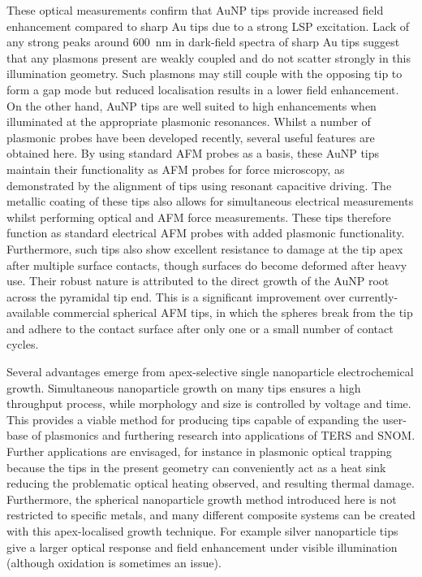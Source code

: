 \documentclass{article}
\begin{document}
These optical measurements confirm that AuNP tips provide increased field enhancement compared to sharp Au tips due to a strong LSP excitation. Lack of any strong peaks around \SI{600}{nm} in dark-field spectra of sharp Au tips suggest that any plasmons present are weakly coupled and do not scatter strongly in this illumination geometry. Such plasmons may still couple with the opposing tip to form a gap mode but reduced localisation results in a lower field enhancement. On the other hand, AuNP tips are well suited to high enhancements when illuminated at the appropriate plasmonic resonances.
Whilst a number of plasmonic probes have been developed recently, several useful features are obtained here. By using standard AFM probes as a basis, these AuNP tips maintain their functionality as AFM probes for force microscopy, as demonstrated by the alignment of tips using resonant capacitive driving. The metallic coating of these tips also allows for simultaneous electrical measurements whilst performing optical and AFM force measurements. These tips therefore function as standard electrical AFM probes with added plasmonic functionality.
Furthermore, such tips also show excellent resistance to damage at the tip apex after multiple surface contacts, though surfaces do become deformed after heavy use. Their robust nature is attributed to the direct growth of the AuNP root across the pyramidal tip end. This is a significant improvement over currently-available commercial spherical AFM tips, in which the spheres break from the tip and adhere to the contact surface after only one or a small number of contact cycles.

Several advantages emerge from apex-selective single nanoparticle electrochemical growth. Simultaneous nanoparticle growth on many tips ensures a high throughput process, while morphology and size is controlled by voltage and time. This provides a viable method for producing tips capable of expanding the user-base of plasmonics and furthering research into applications of TERS and SNOM. Further applications are envisaged, for instance in plasmonic optical trapping \cite{lindquist2013} because the tips in the present geometry can conveniently act as a heat sink reducing the problematic optical heating observed, and resulting thermal damage. Furthermore, the spherical nanoparticle growth method introduced here is not restricted to specific metals, and many different composite systems can be created with this apex-localised growth technique. For example silver nanoparticle tips give a larger optical response and field enhancement under visible illumination (although oxidation is sometimes an issue).
\end{document}
